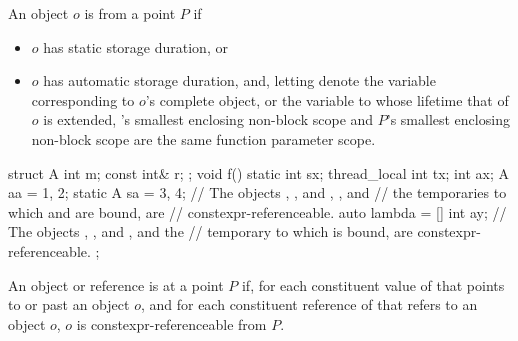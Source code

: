 \documentclass{wg21}
\begin{document}
\begin{addedblock}
An object $o$ is  from a point $P$ if
\begin{itemize}
\item $o$ has static storage duration, or
\item $o$ has automatic storage duration, and, letting  denote the variable corresponding to
$o$’s complete object, or the variable to whose lifetime that of $o$ is extended, ’s smallest
enclosing non-block scope and $P$’s smallest enclosing non-block scope are the same function parameter scope.
\end{itemize}
\begin{example}
\begin{codeblock}
struct A {
    int m;
    const int& r;
};
void f() {
    static int sx;
    thread_local int tx;
    int ax;
    A aa = {1, 2};
    static A sa = {3, 4};
    // The objects , , and , , and
    // the temporaries to which  and  are bound, are
    // constexpr-referenceable.
    auto lambda = [] {
        int ay;
        // The objects , , and , and the
        // temporary to which  is bound, are constexpr-referenceable.
    };
}
\end{codeblock}
\end{example}
\end{addedblock}


\begin{addedblock}
An object or reference  is  at a point $P$ if, for each constituent value
of  that points to or past an object $o$, and for each constituent reference of  that refers to an
object $o$, $o$ is constexpr-referenceable from $P$.
\end{addedblock}

\end{document}
